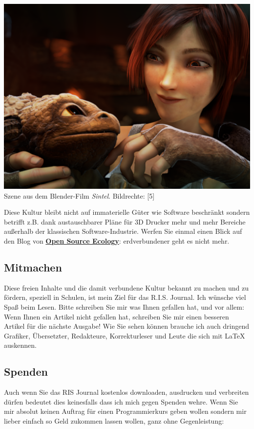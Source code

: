 \begin{center}
\includegraphics[width=\linewidth]{editorial/editorial-sintel.png}\\
\footnotesize{Szene aus dem Blender-Film \emph{Sintel}. Bildrechte: [5]}
\end{center}

Diese Kultur bleibt nicht auf immaterielle Güter wie Software beschränkt sondern betrifft z.B. dank austauschbarer Pläne für 3D Drucker mehr und mehr Bereiche außerhalb der klassischen Software-Industrie. Werfen Sie einmal einen Blick auf den Blog von \href{http://opensourceecology.org/}{\textbf{Open Source Ecology}}: erdverbundener geht es nicht mehr. 

\subsection*{Mitmachen}
Diese freien Inhalte und die damit verbundene Kultur bekannt zu machen und zu fördern, speziell in Schulen, ist mein Ziel für das R.I.S. Journal. Ich wünsche viel Spaß beim Lesen. Bitte schreiben Sie mir was Ihnen gefallen hat, und vor allem: Wenn Ihnen ein Artikel nicht gefallen hat, schreiben Sie mir einen besseren Artikel für die nächste Ausgabe! Wie Sie sehen können brauche ich auch dringend Grafiker, Übersetzter, Redakteure, Korrekturleser und Leute die sich mit {\large \LaTeX} auskennen. 

\subsection*{Spenden}
Auch wenn Sie das RIS Journal kostenlos downloaden, ausdrucken und verbreiten dürfen bedeutet dies keinesfalls dass ich mich gegen Spenden wehre. Wenn Sie mir absolut keinen Auftrag für einen Programmierkurs geben wollen sondern mir lieber einfach so Geld zukommen lassen wollen, ganz ohne Gegenleistung:


